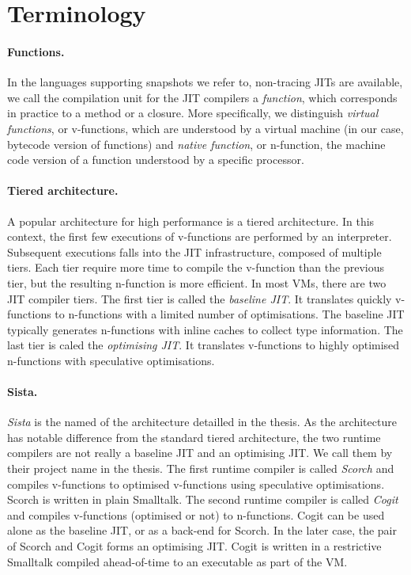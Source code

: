 \documentclass[a4paper,12pt,twoside]{../includes/ThesisStyle}
\begin{document}
\section{Terminology}

\paragraph{Functions.} In the languages supporting snapshots we refer to, non-tracing JITs are available, we call the compilation unit for the JIT compilers a \emph{function}, which corresponds in practice to a method or a closure. More specifically, we distinguish \emph{virtual functions}, or v-functions, which are understood by a virtual machine (in our case, bytecode version of functions) and \emph{native function}, or n-function, the machine code version of a function understood by a specific processor.

\paragraph{Tiered architecture.} A popular architecture for high performance is a tiered architecture. In this context, the first few executions of v-functions are performed by an interpreter. Subsequent executions falls into the JIT infrastructure, composed of multiple tiers. Each tier require more time to compile the v-function than the previous tier, but the resulting n-function is more efficient. In most VMs, there are two JIT compiler tiers. The first tier is called the \emph{baseline JIT}. It translates quickly v-functions to n-functions with a limited number of optimisations. The baseline JIT typically generates n-functions with inline caches to collect type information. The last tier is caled the \emph{optimising JIT}. It translates v-functions to highly optimised n-functions with speculative optimisations.

\paragraph{Sista.} \emph{Sista} is the named of the architecture detailled in the thesis. As the architecture has notable difference from the standard tiered architecture, the two runtime compilers are not really a baseline JIT and an optimising JIT. We call them by their project name in the thesis. The first runtime compiler is called \emph{Scorch} and compiles v-functions to optimised v-functions using speculative optimisations. Scorch is written in plain Smalltalk. The second runtime compiler is called \emph{Cogit} and compiles v-functions (optimised or not) to n-functions. Cogit can be used alone as the baseline JIT, or as a back-end for Scorch. In the later case, the pair of Scorch and Cogit forms an optimising JIT. Cogit is written in a restrictive Smalltalk compiled ahead-of-time to an executable as part of the VM. 
\end{document}
